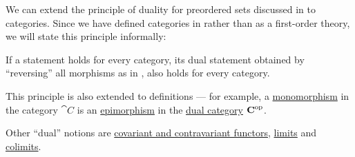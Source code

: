 \begin{remark}\label{thm:categorical_principle_of_duality}
  We can extend the principle of duality for preordered sets discussed in  to categories. Since we have defined categories in \hyperref[def:axiom_of_universes]{} rather than as a first-order theory, we will state this principle informally:
  \begin{displayquote}
    If a statement holds for every category, its dual statement obtained by \enquote{reversing} all morphisms as in , also holds for every category.
  \end{displayquote}

  This principle is also extended to definitions --- for example, a \hyperref[def:morphism_invertibility/monomorphism]{monomorphism} in the category \( \cat{C} \) is an \hyperref[def:morphism_invertibility/epimorphism]{epimorphism} in the \hyperref[def:dual_category]{dual category} \( \operatorname{\mathbf{C}}^{\operatorname{op}} \).

  Other \enquote{dual} notions are \hyperref[def:contravariant_functor]{covariant and contravariant functors}, \hyperref[def:categorical_limit]{limits} and \hyperref[def:categorical_colimit]{colimits}.
\end{remark}
